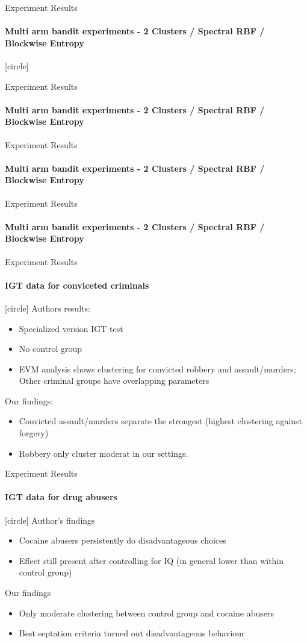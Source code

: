 \documentclass[11pt]{beamer}
\begin{document}
\begin{frame}{Experiment Results}
	\framesubtitle{Multi arm bandit experiments - 2 Clusters / Spectral RBF / Blockwise Entropy}
	[circle]
		\center
		
\end{frame}
	
\begin{frame}{Experiment Results}
	\framesubtitle{Multi arm bandit experiments - 2 Clusters / Spectral RBF / Blockwise Entropy}
	\center
	 
\end{frame}

\begin{frame}{Experiment Results}
	\framesubtitle{Multi arm bandit experiments - 2 Clusters / Spectral RBF / Blockwise Entropy}
	\center
	
\end{frame}

\begin{frame}{Experiment Results}
	\framesubtitle{Multi arm bandit experiments - 2 Clusters / Spectral RBF / Blockwise Entropy}
	\center
	
\end{frame}


\begin{frame}{Experiment Results}
	\framesubtitle{IGT data for conviceted criminals}
	[circle]
	Authors results:
	\begin{itemize}
		\item Specialized version IGT test
		\item No control group
		\item EVM analysis shows clustering for convicted robbery and assault/murders; Other criminal groups have overlapping parameters
	\end{itemize}
		Our findings:
		\begin{itemize}
			\item Convicted assault/murders separate the strongest (highest clustering against forgery)
			\item Robbery only cluster moderat in our settings. 
		\end{itemize}
\end{frame}

\begin{frame}{Experiment Results}
	\framesubtitle{IGT data for drug abusers}
	[circle]
	Author's findings
	\begin{itemize}
		\item Cocaine abusers persistently do disadvantageous choices
		\item Effect still present after controlling for IQ (in general lower than within control group)
	\end{itemize}
	Our findings
	\begin{itemize}
		\item Only moderate clustering between control group and cocaine abusers
		\item Best septation criteria turned out disadvantageous behaviour
	\end{itemize}
\end{frame}
\end{document}
